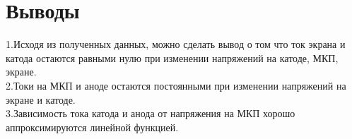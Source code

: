 \documentclass[a4paper,12pt]{article}
\begin{document}
\section*{Выводы}

1.Исходя из полученных данных, можно сделать вывод о том что ток экрана и катода остаются равными нулю при изменении напряжений на катоде, МКП, экране. \\
2.Токи на МКП и аноде остаются постоянными при изменении напряжений на экране и катоде. \\
3.Зависимость тока катода и анода от напряжения на МКП хорошо аппроксимируются линейной функцией. 
\end{document}
